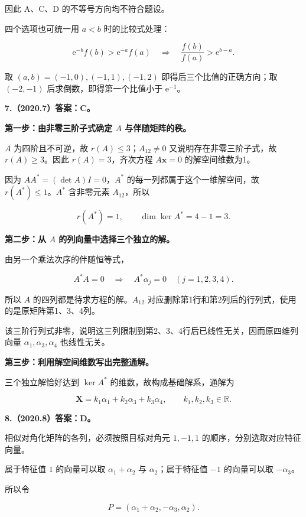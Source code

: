 \documentclass[UTF8,11pt,fontset=windows]{ctexart}
\begin{document}
因此 A、C、D 的不等号方向均不符合题设。

四个选项也可统一用 $a<b$ 时的比较式处理：

$$
\mathrm e^{-b}f(b)>\mathrm e^{-a}f(a)
\quad\Longrightarrow\quad
\frac{f(b)}{f(a)}>\mathrm e^{b-a}.
$$

取 $(a,b)=(-1,0),(-1,1),(-1,2)$ 即得后三个比值的正确方向；取 $(-2,-1)$ 后求倒数，即得第一个比值小于 $\mathrm e^{-1}$。

\clearpage

\textbf{7.（2020.7）答案：C。}

\textbf{第一步：由非零三阶子式确定 $A$ 与伴随矩阵的秩。}

$A$ 为四阶且不可逆，故 $r(A)\le3$；$A_{12}\ne0$ 又说明存在非零三阶子式，故 $r(A)\ge3$。因此 $r(A)=3$，齐次方程 $A\boldsymbol x=0$ 的解空间维数为1。

因为 $AA^*=(\det A)I=0$，$A^*$ 的每一列都属于这个一维解空间，故 $r(A^*)\le1$。$A^*$ 含非零元素 $A_{12}$，所以

$$
r(A^*)=1,\qquad \dim\ker A^*=4-1=3.
$$

\textbf{第二步：从 $A$ 的列向量中选择三个独立的解。}

由另一个乘法次序的伴随恒等式，

$$
A^*A=0
\quad\Longrightarrow\quad A^*\alpha_j=0\quad(j=1,2,3,4).
$$

所以 $A$ 的四列都是待求方程的解。$A_{12}$ 对应删除第1行和第2列后的行列式，使用的是原矩阵第1、3、4列。

该三阶行列式非零，说明这三列限制到第2、3、4行后已线性无关，因而原四维列向量 $\alpha_1,\alpha_3,\alpha_4$ 也线性无关。

\textbf{第三步：利用解空间维数写出完整通解。}

三个独立解恰好达到 $\ker A^*$ 的维数，故构成基础解系，通解为

$$
\boxed{\boldsymbol X=k_1\alpha_1+k_2\alpha_3+k_3\alpha_4,\qquad k_1,k_2,k_3\in\mathbb R.}
$$

\clearpage

\textbf{8.（2020.8）答案：D。}

相似对角化矩阵的各列，必须按照目标对角元 $1,-1,1$ 的顺序，分别选取对应特征向量。

属于特征值 $1$ 的向量可以取 $\alpha_1+\alpha_2$ 与 $\alpha_2$；属于特征值 $-1$ 的向量可以取 $-\alpha_3$。

所以令

$$
P=(\alpha_1+\alpha_2,-\alpha_3,\alpha_2).
$$
\end{document}
